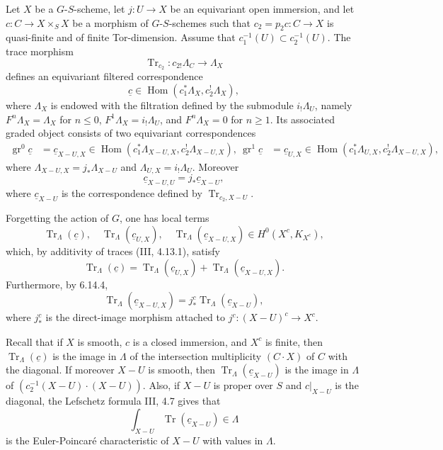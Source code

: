 \documentclass[12pt]{article}
\newcommand{\Hom}{\operatorname{Hom}}
\newcommand{\Tr}{\operatorname{Tr}}
\newcommand{\gr}{\operatorname{gr}}
\begin{document}
Let $X$ be a $G$-$S$-scheme, let $j:U\to X$ be an equivariant open immersion, and let
$c:C\to X\times_S X$ be a morphism of $G$-$S$-schemes such that
$c_2=p_2c:C\to X$ is quasi-finite and of finite Tor-dimension. Assume that
$c_1^{-1}(U)\subset c_2^{-1}(U)$. The trace morphism
\[
      \Tr_{c_2}:c_{2!}\Lambda_C\longrightarrow \Lambda_X
\]
defines an equivariant filtered correspondence
\begin{equation}\tag{6.14.2}
      \underline c\in\Hom(c_1^*\Lambda_X,c_2^{!}\Lambda_X),
\end{equation}
where $\Lambda_X$ is endowed with the filtration defined by the submodule
$i_!\Lambda_U$, namely $F^n\Lambda_X=\Lambda_X$ for $n\le0$,
$F^1\Lambda_X=i_!\Lambda_U$, and $F^n\Lambda_X=0$ for $n\ge1$. Its associated
graded object consists of two equivariant correspondences
\begin{align}
\gr^0\underline c&=\underline c_{X-U,X}
   \in\Hom(c_1^*\Lambda_{X-U,X},c_2^{!}\Lambda_{X-U,X}),\tag{6.14.3}\
\gr^1\underline c&=\underline c_{U,X}
   \in\Hom(c_1^*\Lambda_{U,X},c_2^{!}\Lambda_{X-U,X}),
\end{align}
where $\Lambda_{X-U,X}=j_*\Lambda_{X-U}$ and
$\Lambda_{U,X}=i_!\Lambda_U$. Moreover
\begin{equation}\tag{6.14.4}
        \underline c_{X-U,U}=j_*\underline c_{X-U},
\end{equation}
where $\underline c_{X-U}$ is the correspondence defined by
$\Tr_{c_2,X-U}$.

Forgetting the action of $G$, one has local terms
\begin{equation}\tag{6.14.5}
\Tr_\Lambda(\underline c),\quad
\Tr_\Lambda(\underline c_{U,X}),\quad
\Tr_\Lambda(\underline c_{X-U,X})\in H^0(X^c,K_{X^c}),
\end{equation}
which, by additivity of traces (III, 4.13.1), satisfy
\begin{equation}\tag{6.14.6}
\Tr_\Lambda(\underline c)=\Tr_\Lambda(\underline c_{U,X})
+\Tr_\Lambda(\underline c_{X-U,X}).
\end{equation}
Furthermore, by 6.14.4,
\begin{equation}\tag{6.14.7}
\Tr_\Lambda(\underline c_{X-U,X})=j_*^c\Tr_\Lambda(\underline c_{X-U}),
\end{equation}
where $j_*^c$ is the direct-image morphism attached to
$j^c:(X-U)^c\to X^c$.

Recall that if $X$ is smooth, $c$ is a closed immersion, and $X^c$ is finite, then
$\Tr_\Lambda(\underline c)$ is the image in $\Lambda$ of the intersection multiplicity
$(C\cdot X)$ of $C$ with the diagonal. If moreover $X-U$ is smooth, then
$\Tr_\Lambda(\underline c_{X-U})$ is the image in $\Lambda$ of
$(c_2^{-1}(X-U)\cdot (X-U))$. Also, if $X-U$ is proper over $S$ and
$c|_{X-U}$ is the diagonal, the Lefschetz formula III, 4.7 gives that
\[
     \int_{X-U}\Tr(\underline c_{X-U})\in\Lambda
\]
is the Euler-Poincaré characteristic of $X-U$ with values in $\Lambda$.
\end{document}
